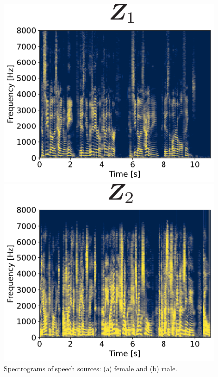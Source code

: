 \begin{figure}[htbp]
  \begin{minipage}[b]{0.45\linewidth}
    \centering
    \includegraphics[keepaspectratio, scale=0.38]{figures/female_audio_spec_init.pdf}
    \subcaption{}
  \end{minipage}
  \begin{minipage}[b]{0.45\linewidth}
    \centering
    \includegraphics[keepaspectratio, scale=0.38]{figures/male_audio_spec_init.pdf}
    \subcaption{}
  \end{minipage}
  \caption{Spectrograms of speech sources: (a) female and (b) male.}
  \label{fig:audio}
\end{figure}

